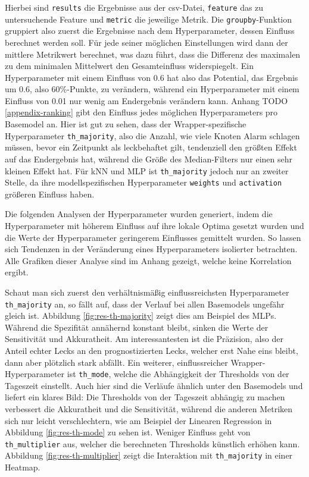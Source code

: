 Hierbei sind \texttt{results} die Ergebnisse aus der csv-Datei, \texttt{feature} das zu untersuchende Feature
 und \texttt{metric} die jeweilige Metrik. Die \texttt{groupby}-Funktion gruppiert also zuerst die Ergebnisse
 nach dem Hyperparameter, dessen Einfluss berechnet werden soll. Für jede seiner möglichen Einstellungen wird
 dann der mittlere Metrikwert berechnet, was dazu führt, dass die Differenz des maximalen zu dem minimalen
 Mittelwert den Gesamteinfluss widerspiegelt. Ein Hyperparameter mit einem Einfluss von 0.6 hat also das
 Potential, das Ergebnis um 0.6, also 60\%-Punkte, zu verändern, während ein Hyperparameter mit einem Einfluss
 von 0.01 nur wenig am Endergebnis verändern kann. Anhang TODO \ref{appendix-ranking} gibt den Einfluss jedes
 möglichen Hyperparameters pro Basemodel an. Hier ist gut zu sehen, dass der Wrapper-spezifische Hyperparameter
 \texttt{th\_majority}, also die Anzahl, wie viele Knoten Alarm schlagen müssen, bevor ein Zeitpunkt als
 leckbehaftet gilt, tendenziell den größten Effekt auf das Endergebnis hat, während die Größe des Median-Filters
 nur einen sehr kleinen Effekt hat. Für kNN und MLP ist \texttt{th\_majority} jedoch nur an zweiter Stelle, da
 ihre modellspezifischen Hyperparameter \texttt{weights} und \texttt{activation} größeren Einfluss haben.

Die folgenden Analysen der Hyperparameter wurden generiert, indem die Hyperparameter mit höherem Einfluss auf
 ihre lokale Optima gesetzt wurden und die Werte der Hyperparameter geringerem Einflusses gemittelt wurden.
 So lassen sich Tendenzen in der Veränderung eines Hyperparameters isolierter betrachten. Alle Grafiken dieser
 Analyse sind im Anhang gezeigt, welche keine Korrelation ergibt.

Schaut man sich zuerst den verhältnismäßig einflussreichsten Hyperparameter \texttt{th\_majority} an, so fällt auf,
 dass der Verlauf bei allen Basemodels ungefähr gleich ist. Abbildung \ref{fig:res-th-majority} zeigt dies am
 Beispiel des MLPs. Während die Spezifität annähernd konstant bleibt, sinken die Werte der Sensitivität und
 Akkuratheit. Am interessantesten ist die Präzision, also der Anteil echter Lecks an den prognostizierten Lecks,
 welcher erst Nahe eins bleibt, dann aber plötzlich stark abfällt. Ein weiterer, einflussreicher
 Wrapper-Hyperparameter ist \texttt{th\_mode}, welche die Abhängigkeit der Thresholds von der Tageszeit einstellt.
 Auch hier sind die Verläufe ähnlich unter den Basemodels und liefert ein klares Bild: Die Thresholds von der
 Tageszeit abhängig zu machen verbessert die Akkuratheit und die Sensitivität, während die anderen Metriken sich
 nur leicht verschlechtern, wie am Beispiel der Linearen Regression in Abbildung \ref{fig:res-th-mode} zu sehen
 ist. Weniger Einfluss geht von \texttt{th\_multiplier} aus, welcher die berechneten Thresholds künstlich erhöhen
 kann. Abbildung \ref{fig:res-th-multiplier} zeigt die Interaktion mit \texttt{th\_majority} in einer Heatmap.

